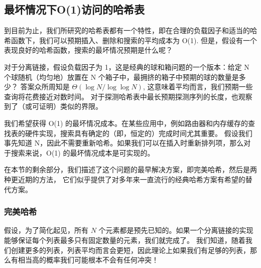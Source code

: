 \documentclass[a4paper]{ctexart}
\theoremstyle{definition}
\theoremstyle{definition}
\begin{document}

\subsection{最坏情况下O(1)访问的哈希表}

到目前为止，我们所研究的哈希表都有一个特性，即在合理的负载因子和适当的哈希函数下，我们可以预期插入、删除和搜索的平均成本为 O(1). 
但是，假设有一个表现良好的哈希函数，搜索的最坏情况预期是什么呢？

对于分离链接，假设负载因子为 1，这是经典的球和箱问题的一个版本：给定 N 个球随机（均匀地）放置在 N 个箱子中，最拥挤的箱子中预期的球的数量是多少？
答案众所周知是 $\Theta(\log N / \log \log N)$, 这意味着平均而言，我们预期一些查询将花费接近对数时间。
对于探测哈希表中最长预期探测序列的长度，也观察到了（或可证明）类似的界限。

我们希望获得 O(1) 的最坏情况成本。在某些应用中，例如路由器和内存缓存的查找表的硬件实现，搜索具有确定的（即，恒定的）完成时间尤其重要。
假设我们事先知道 N，因此不需要重新哈希。如果我们可以在插入时重新排列项，那么对于搜索来说，O(1) 的最坏情况成本是可实现的。

在本节的剩余部分，我们描述了这个问题的最早解决方案，即完美哈希，然后是两种更近期的方法，
它们似乎提供了对多年来一直流行的经典哈希方案有希望的替代方案。

\subsubsection{完美哈希}

假设，为了简化起见，所有 \( N \) 个元素都是预先已知的。如果一个分离链接的实现能够保证每个列表最多只有固定数量的元素，我们就完成了。
我们知道，随着我们创建更多的列表，列表平均而言会更短，因此理论上如果我们有足够的列表，那么有相当高的概率我们可能根本不会有任何冲突！
\end{document}
